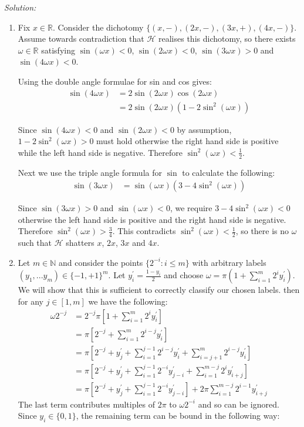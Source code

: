 \documentclass[
10pt, %
a4paper, %
oneside, %
headinclude,footinclude, %
BCOR5mm, %
]{scrartcl}
\newenvironment{solution}
               {\textit{Solution:}}
               {}
\begin{document}
\begin{solution}
\begin{enumerate}[label=(\alph*)]
  \item Fix $x\in\mathbb{R}$. Consider the dichotomy $\{(x, -), (2x, -), (3x, +), (4x, -)\}$. Assume towards contradiction that $\mathcal{H}$ realises this dichotomy, so there exists $\omega\in\mathbb{R}$ satisfying $\sin(\omega x) < 0$, $\sin(2 \omega x) < 0$, $\sin(3 \omega x) > 0$ and $\sin(4 \omega x) < 0$.

  Using the double angle formulae for sin and cos gives:
  \begin{align*}
    \sin(4\omega x) &= 2 \sin(2\omega x)\cos(2\omega x) \\
    &= 2\sin(2\omega x) (1 - 2\sin^2(\omega x))
  \end{align*}

  Since $\sin(4\omega x) < 0$ and $\sin(2\omega x) < 0$ by assumption, $1 - 2\sin^2(\omega x) > 0$ must hold otherwise the right hand side is positive while the left hand side is negative. Therefore $\sin^2(\omega x) < \frac{1}{2}$.

  Next we use the triple angle formula for $\sin$ to calculate the following:
  \begin{align*}
    \sin(3\omega x) &= \sin(\omega x)(3 - 4\sin^2(\omega x))
  \end{align*}

  Since $\sin(3\omega x) > 0$ and $\sin(\omega x) < 0$, we require $3 - 4\sin^2(\omega x) < 0$ otherwise the left hand side is positive and the right hand side is negative. Therefore $\sin^2(\omega x) > \frac{3}{4}$. This contradicts $\sin^2(\omega x) < \frac{1}{2}$, so there is no $\omega$ such that $\mathcal{H}$ shatters $x$, $2x$, $3x$ and $4x$.

\item Let $m \in \mathbb{N}$ and consider the points $\{2^{-i}: i \leq m\}$ with arbitrary labels $(y_1, ... y_{m}) \in \{-1, +1\}^m$. Let $y_i^\prime = \frac{1-y_i}{2}$ and choose $\omega = \pi(1 + \sum_{i=1}^m 2^{i}y_i^\prime)$. We will show that this is sufficient to correctly classify our chosen labels. then for any $j\in[1,m]$ we have the following:
    \begin{align*}
      \omega 2^{-j} &= 2^{-j} \pi\left[1 + \sum_{i=1}^m 2^{i}y_i^\prime\right] \\
      &= \pi \left[2^{-j} + \sum_{i=1}^m 2^{i-j}y_i^\prime\right] \\
      &= \pi \left[2^{-j} + y_j^\prime + \sum_{i=1}^{j-1} 2^{i-j}y_i^\prime + \sum_{i=j+1}^m 2^{i-j}y_i^\prime \right] \\
      &= \pi \left[2^{-j} + y_j^\prime + \sum_{i=1}^{j-1} 2^{-i}y_{j-i}^\prime + \sum_{i=1}^{m-j} 2^iy_{i+j}^\prime \right] \\
      &= \pi \left[2^{-j} + y_j^\prime + \sum_{i=1}^{j-1} 2^{-i}y_{j-i}^\prime\right] + 2\pi \sum_{i=1}^{m-j} 2^{i-1}y_{i+j}^\prime
    \end{align*}
  The last term contributes multiples of $2\pi$ to $\omega 2^{-i}$ and so can be ignored. Since $y_i\in\{0,1\}$, the remaining term can be bound in the following way:


\end{enumerate}
\end{solution}
\end{document}
